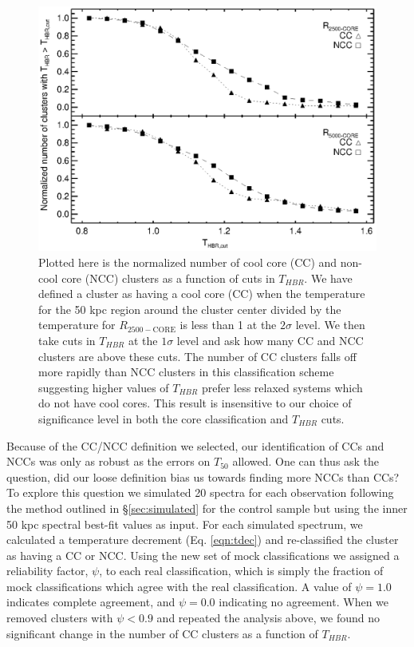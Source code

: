 \documentclass[12pt,preprint]{aastex}
\begin{document}
\clearpage
\begin{figure}
\begin{center}
\includegraphics*[width=\textwidth, trim=15mm 10mm 0mm 0mm, clip]{f5.eps}
\caption{
Plotted here is the normalized number of cool core (CC) and non-cool core
(NCC) clusters as a function of cuts in $T_{HBR}$. We have defined a
cluster as having a cool core (CC) when the temperature for the 50 kpc
region around the cluster center divided by the temperature for
$R_{2500-\mathrm{CORE}}$ is less than 1 at the $2\sigma$ level. We then
take cuts in $T_{HBR}$ at the $1\sigma$ level and ask how many CC and
NCC clusters are above these cuts. The number of CC clusters falls off
more rapidly than NCC clusters in this classification scheme
suggesting higher values of $T_{HBR}$ prefer less relaxed systems
which do not have cool cores. This result is insensitive to our choice
of significance level in both the core classification and $T_{HBR}$
cuts.
}
\label{fig:cc_ncc_bin}
\end{center}
\end{figure}
\clearpage

Because of the CC/NCC definition we selected, our identification of
CCs and NCCs was only as robust as the errors on $T_{50}$ allowed. One can
thus ask the question, did our loose definition bias us towards
finding more NCCs than CCs? To explore this question we simulated 20
spectra for each observation following the method outlined in
\S\ref{sec:simulated} for the control sample but using the inner 50
kpc spectral best-fit values as input. For each simulated spectrum, we
calculated a temperature decrement (Eq. \ref{eqn:tdec}) and
re-classified the cluster as having a CC or NCC. Using the new set of
mock classifications we assigned a reliability factor, $\psi$, to each
real classification, which is simply the fraction of mock
classifications which agree with the real classification. A value of
$\psi = 1.0$ indicates complete agreement, and $\psi = 0.0$ indicating no
agreement. When we removed clusters with $\psi < 0.9$ and repeated the
analysis above, we found no significant change in the number of CC
clusters as a function of $T_{HBR}$.
\end{document}
